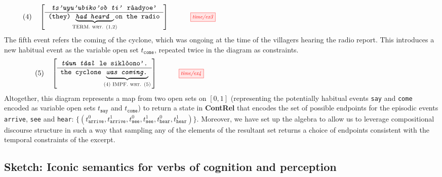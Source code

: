 \begin{example}
\[(4) \quad \left[ \begin{array}{c} \texttt{\emph{ts'uyu'ubiko'ob ti'} r\`{a}adyoe'} \\ \hline \texttt{(they) }\underbrace{\texttt{\emph{had heard }}}_{\textsc{\makebox[0pt]{TERM. wrt. (1,2)}}}\texttt{on the radio} \end{array} \right] \quad \vcenter{\scalebox{0.75}{\tikzfig{time/ex3}}}\]
The fifth event refers the coming of the cyclone, which was ongoing at the time of the villagers hearing the radio report. This introduces a new habitual event as the variable open set $t_\texttt{come}$, repeated twice in the diagram as constraints.
\[(5) \quad \left[ \begin{array}{c} \texttt{\emph{t\'{u}un t\`{a}al} le sikl\`{o}ono'.} \\ \hline \texttt{the cyclone }\underbrace{\texttt{\emph{was coming.}}}_{\textsc{\makebox[0pt]{(4) IMPF. wrt. (5)}}} \end{array} \right] \quad \vcenter{\scalebox{0.75}{\tikzfig{time/ex4}}}\]
Altogether, this diagram represents a map from two open sets on $[0,1]$ (representing the potentially habitual events \texttt{say} and \texttt{come} encoded as variable open sets $t_\texttt{say}$ and $t_\texttt{come}$) to return a state in \textbf{ContRel} that encodes the set of possible endpoints for the episodic events \texttt{arrive}, \texttt{see} and \texttt{hear}: $\{(t_\texttt{arrive}^0,t_\texttt{arrive}^1,t_\texttt{see}^0,t_\texttt{see}^1,t_\texttt{hear}^0,t_\texttt{hear}^1)\}$. Moreover, we have set up the algebra to allow us to leverage compositional discourse structure in such a way that sampling any of the elements of the resultant set returns a choice of endpoints consistent with the temporal constraints of the excerpt.
\end{example}

\subsection{Sketch: Iconic semantics for verbs of cognition and perception}
